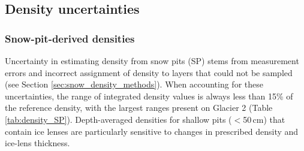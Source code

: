 \documentclass{sfuthesis}
\begin{document}
{\subsection{Density uncertainties}

\subsubsection{Snow-pit-derived densities}

Uncertainty in estimating density from snow pits (SP) stems from measurement errors and incorrect assignment of density to layers that could not be sampled (see Section \ref{sec:snow_density_methods}). When accounting for these uncertainties, the range of integrated density values is always less than 15\% of the reference density, with the largest ranges present on Glacier 2 (Table \ref{tab:density_SP}). Depth-averaged densities for shallow pits ($<$50\,cm) that contain ice lenses are particularly sensitive to changes in prescribed density and ice-lens thickness.

\begin{table}
\centering
\caption[Summary of integrated snow density values calculated from snow-pit measurements]{Summary of integrated snow density values calculated from snow-pit measurements. The reference density values are calculated with an ice-layer density of 917\,kg\,m$^{-3}$ and a `hard' snow density of 600\,kg\,m$^{-3}$. To determine the error in estimating integrated snow density, ice density, ice thickness and the `hard' layer density are varied between 700 and 917\,kg\,m$^{-3}$, $\pm$ 1\,cm and 500 and 600\,kg\,m$^{-3}$, respectively.}
\label{tab:density_SP}
\end{table}}
\end{document}
